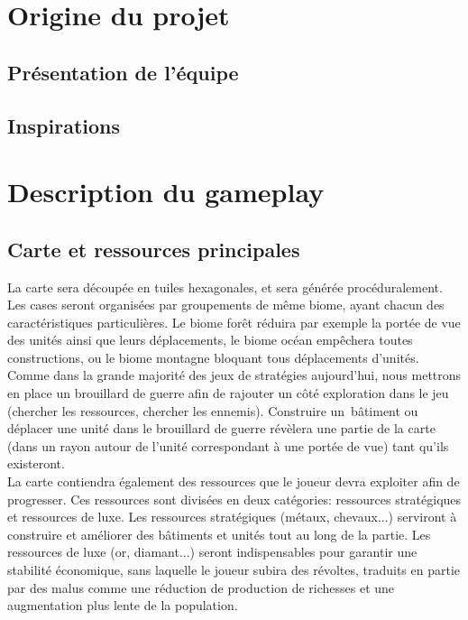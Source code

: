 \documentclass[12pt]{report}
\begin{document}
\begin{titlepage}
\chapter{Origine du projet}

\section{Présentation de l'équipe}
\section{Inspirations}

\chapter{Description du gameplay}

\section{Carte et ressources principales}

La carte sera découpée en tuiles hexagonales, et sera générée procéduralement.  Les cases seront organisées par groupements de même biome, ayant chacun des caractéristiques particulières. Le biome forêt réduira par exemple la portée de vue des unités ainsi que leurs déplacements, le biome océan empêchera toutes constructions, ou le biome montagne bloquant tous déplacements d'unités.\\

Comme dans la grande majorité des jeux de stratégies aujourd'hui, nous mettrons en place un brouillard de guerre afin de rajouter un côté exploration dans le jeu (chercher les ressources, chercher les ennemis). Construire un  bâtiment ou déplacer une unité dans le brouillard de guerre révèlera une partie de la carte (dans un rayon autour de l'unité correspondant à une portée de vue) tant qu'ils existeront.\\

La carte contiendra également des ressources que le joueur devra exploiter afin de progresser. Ces ressources sont divisées en deux catégories: ressources stratégiques et ressources de luxe. Les ressources stratégiques (métaux, chevaux...) serviront à construire et améliorer des bâtiments et unités tout au long de la partie. Les ressources de luxe (or, diamant...) seront indispensables pour garantir une stabilité économique, sans laquelle le joueur subira des révoltes, traduits en partie par des malus comme une réduction de production de richesses et une augmentation plus lente de la population. 


\end{titlepage}
\end{document}
